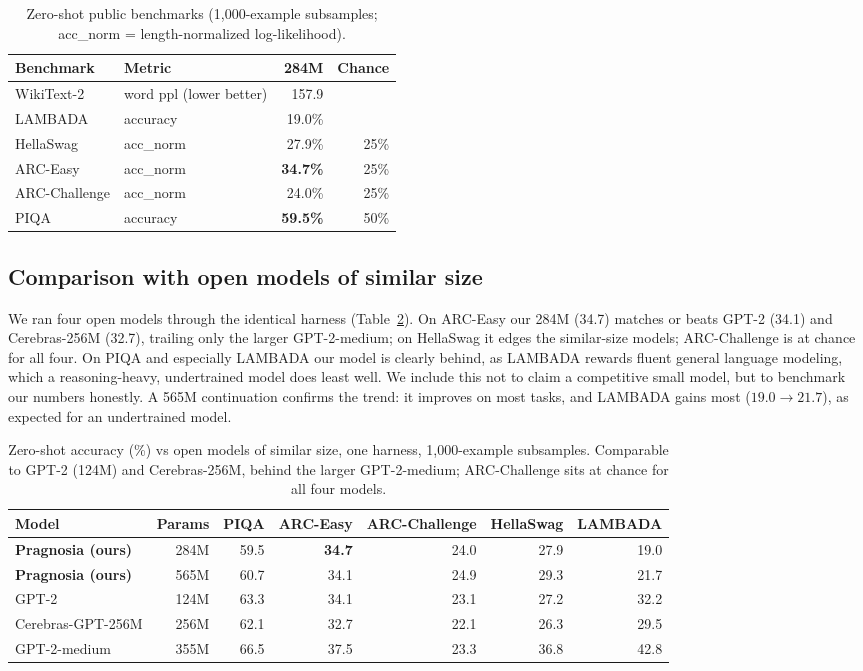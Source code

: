 \documentclass[journal]{IEEEtran}
\begin{document}
\begin{table}[t]\centering\small
\caption{Zero-shot public benchmarks (1{,}000-example subsamples; acc\_norm = length-normalized log-likelihood).}
\label{tab:bench}
\begin{tabular}{@{}l l r r@{}}
\toprule
Benchmark & Metric & 284M & Chance \\
\midrule
WikiText-2 & word ppl (lower better) & 157.9 & \\
LAMBADA & accuracy & 19.0\% & \\
HellaSwag & acc\_norm & 27.9\% & 25\% \\
ARC-Easy & acc\_norm & \textbf{34.7\%} & 25\% \\
ARC-Challenge & acc\_norm & 24.0\% & 25\% \\
PIQA & accuracy & \textbf{59.5\%} & 50\% \\
\bottomrule
\end{tabular}
\end{table}

\subsection{Comparison with open models of similar size}
We ran four open models through the identical harness (Table~\ref{tab:open}). On ARC-Easy our 284M (34.7) matches or beats GPT-2 (34.1) and Cerebras-256M (32.7), trailing only the larger GPT-2-medium; on HellaSwag it edges the similar-size models; ARC-Challenge is at chance for all four. On PIQA and especially LAMBADA our model is clearly behind, as LAMBADA rewards fluent general language modeling, which a reasoning-heavy, undertrained model does least well. We include this not to claim a competitive small model, but to benchmark our numbers honestly. A 565M continuation confirms the trend: it improves on most tasks, and LAMBADA gains most ($19.0\to21.7$), as expected for an undertrained model.

\begin{table}[t]\centering\small
\caption{Zero-shot accuracy (\%) vs open models of similar size, one harness, 1{,}000-example subsamples. Comparable to GPT-2 (124M) and Cerebras-256M, behind the larger GPT-2-medium; ARC-Challenge sits at chance for all four models.}
\label{tab:open}
\begin{tabular}{@{}l r r r r r r@{}}
\toprule
Model & Params & PIQA & ARC-Easy & ARC-Challenge & HellaSwag & LAMBADA \\
\midrule
\textbf{Pragnosia (ours)} & 284M & 59.5 & \textbf{34.7} & 24.0 & 27.9 & 19.0 \\
\textbf{Pragnosia (ours)} & 565M & 60.7 & 34.1 & 24.9 & 29.3 & 21.7 \\
GPT-2 & 124M & 63.3 & 34.1 & 23.1 & 27.2 & 32.2 \\
Cerebras-GPT-256M & 256M & 62.1 & 32.7 & 22.1 & 26.3 & 29.5 \\
GPT-2-medium & 355M & 66.5 & 37.5 & 23.3 & 36.8 & 42.8 \\
\bottomrule
\end{tabular}
\end{table}
\end{document}

